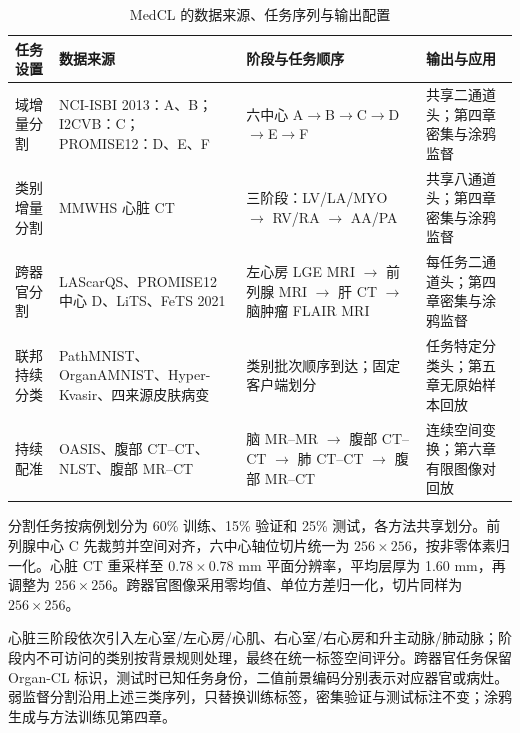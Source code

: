 \begin{table}[htbp]
\centering
\caption{MedCL 的数据来源、任务序列与输出配置}
\label{tab:medcl-cross-chapter-data}
\label{tab:benchmark-datasets}
\thesistablefont
\setlength{\tabcolsep}{3pt}
\renewcommand{\arraystretch}{1.16}
\begin{tabularx}{\textwidth}{@{}p{2.0cm}XXp{2.7cm}@{}}
\toprule
任务设置 & 数据来源 & 阶段与任务顺序 & 输出与应用 \\
\midrule
域增量分割 & NCI-ISBI 2013：A、B；I2CVB：C；PROMISE12：D、E、F & 六中心 A$\rightarrow$B$\rightarrow$C$\rightarrow$D$\rightarrow$E$\rightarrow$F & 共享二通道头；第四章密集与涂鸦监督 \\
\addlinespace
类别增量分割 & MMWHS 心脏 CT & 三阶段：LV/LA/MYO $\rightarrow$ RV/RA $\rightarrow$ AA/PA & 共享八通道头；第四章密集与涂鸦监督 \\
\addlinespace
跨器官分割 & LAScarQS、PROMISE12 中心 D、LiTS、FeTS 2021 & 左心房 LGE MRI $\rightarrow$ 前列腺 MRI $\rightarrow$ 肝 CT $\rightarrow$ 脑肿瘤 FLAIR MRI & 每任务二通道头；第四章密集与涂鸦监督 \\
\addlinespace
联邦持续分类 & PathMNIST、OrganAMNIST、Hyper-Kvasir、四来源皮肤病变 & 类别批次顺序到达；固定客户端划分 & 任务特定分类头；第五章无原始样本回放 \\
\addlinespace
持续配准 & OASIS、腹部 CT--CT、NLST、腹部 MR--CT & 脑 MR--MR $\rightarrow$ 腹部 CT--CT $\rightarrow$ 肺 CT--CT $\rightarrow$ 腹部 MR--CT & 连续空间变换；第六章有限图像对回放 \\
\bottomrule
\end{tabularx}
\end{table}

分割任务按病例划分为 60\% 训练、15\% 验证和 25\% 测试，各方法共享划分。前列腺中心 C 先裁剪并空间对齐，六中心轴位切片统一为 $256\times256$，按非零体素归一化\cite{dataset_prostate2,dataset_prostate,dataset_prostate3,dataset_domaincl}。心脏 CT 重采样至 $0.78\times0.78$ mm 平面分辨率，平均层厚为 1.60 mm，再调整为 $256\times256$\cite{care25ASA1,discussion_inter_seg3,care25ASA2}。跨器官图像采用零均值、单位方差归一化，切片同样为 $256\times256$\cite{dataset_lascars,dataset_lascars2,dataset_taskcl,dataset_taskcl2}。

心脏三阶段依次引入左心室/左心房/心肌、右心室/右心房和升主动脉/肺动脉；阶段内不可访问的类别按背景规则处理，最终在统一标签空间评分。跨器官任务保留 Organ-CL 标识，测试时已知任务身份，二值前景编码分别表示对应器官或病灶。弱监督分割沿用上述三类序列，只替换训练标签，密集验证与测试标注不变；涂鸦生成与方法训练见第四章。


